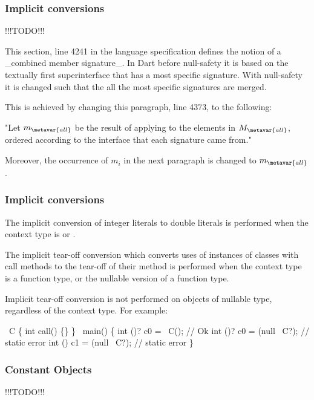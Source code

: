 \documentclass[makeidx]{article}
\begin{document}
\subsubsection{Implicit conversions}

!!!TODO!!!

This section, line 4241
in the language specification defines the notion of a _combined member
signature_. In Dart before null-safety it is based on the textually first
superinterface that has a most specific signature. With null-safety it
is changed such that the all the most specific signatures are merged.

This is achieved by changing this paragraph, line 4373,
to the following:

"Let $m_{\metavar{all}}$ be the result of applying \TopMergeTypeName{} to
the elements in $M_{\metavar{all}}$, ordered according to the interface
 that each signature came from."

Moreover, the occurrence of $m_i$ in the next paragraph is
changed to $m_{\metavar{all}}$.

\subsubsection{Implicit conversions}

The implicit conversion of integer literals to double literals is performed when
the context type is  or .

The implicit tear-off conversion which converts uses of instances of classes
with call methods to the tear-off of their \CALL{} method is performed when the
context type is a function type, or the nullable version of a function type.

Implicit tear-off conversion is not performed on objects of nullable type,
regardless of the context type.  For example:

\begin{dartCode}
\CLASS\ C \{
  int call() \{\}
\}
\VOID\ main() \{
  int \FUNCTION()? c0 = \NEW\ C(); // Ok
  int \FUNCTION()? c0 = (null \AS\ C?); // static error
  int \FUNCTION()  c1 = (null \AS\ C?); // static error
\}
\end{dartCode}

\subsubsection{Constant Objects}

!!!TODO!!!
\end{document}
